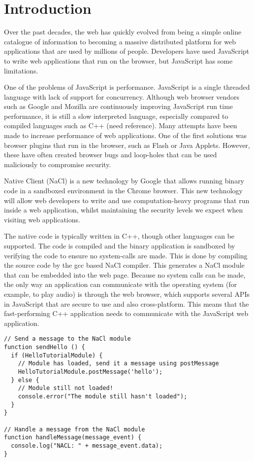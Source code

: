 \chapter{Introduction} 

\label{Chapter1}

Over the past decades, the web has quickly evolved from being a simple online catalogue of information to becoming a massive distributed platform for web applications that are used by millions of people. Developers have used JavaScript to write web applications that run on the browser, but JavaScript has some limitations. 

One of the problems of JavaScript is performance. JavaScript is a single threaded language with lack of support for concurrency. Although web browser vendors such as Google and Mozilla are continuously improving JavaScript run time performance, it is still a slow interpreted language, especially compared to compiled languages such as C++ (need reference). Many attempts have been made to increase performance of web applications. One of the first solutions was browser plugins that run in the browser, such as Flash or Java Applets. However, these have often created browser bugs and loop-holes that can be used maliciously to compromise security.

Native Client \cite{nacl} (NaCl) is a new technology by Google that allows running binary code in a sandboxed environment in the Chrome browser. This new technology will allow web developers to write and use computation-heavy programs that run inside a web application, whilst maintaining the security levels we expect when visiting web applications.

The native code is typically written in C++, though other languages can be supported. The code is compiled and the binary application is sandboxed by verifying the code to ensure no system-calls are made. This is done by compiling the source code by the gcc based NaCl compiler. This generates a NaCl module that can be embedded into the web page. Because no system calls can be made, the only way an application can communicate with the operating system (for example, to play audio) is through the web browser, which supports several APIs in JavaScript that are secure to use and also cross-platform. This means that the fast-performing C++ application needs to communicate with the JavaScript web application.

\begin{lstlisting}
// Send a message to the NaCl module
function sendHello () {
  if (HelloTutorialModule) {
    // Module has loaded, send it a message using postMessage
    HelloTutorialModule.postMessage('hello');
  } else {
    // Module still not loaded!
    console.error("The module still hasn't loaded");
  }
}

// Handle a message from the NaCl module
function handleMessage(message_event) {
  console.log("NACL: " + message_event.data);
}
\end{lstlisting}


